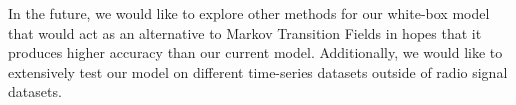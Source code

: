 \documentclass{turabian-thesis}[12pt]
\begin{document}
In the future, we would like to explore other methods for our white-box model that would act as an alternative to Markov Transition Fields in hopes that it produces higher accuracy than our current model. Additionally, we would like to extensively test our model on different time-series datasets outside of radio signal datasets.

%          
%          
%          
%          
%          
%          




 
\end{document}
